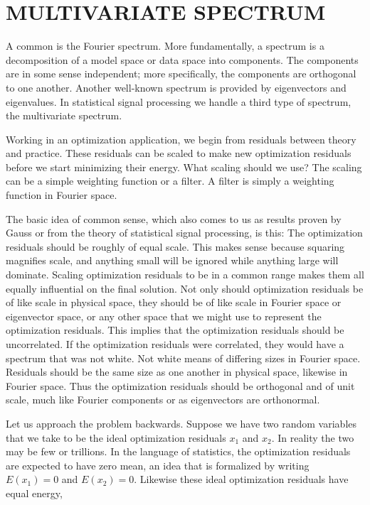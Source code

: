 \section{MULTIVARIATE SPECTRUM}
A common  is the Fourier spectrum.
More fundamentally,
a spectrum is a decomposition
of a model space or data space into components.
The components are in some sense independent; more specifically,
the components are orthogonal to one another.
Another well-known spectrum
is provided by eigenvectors and eigenvalues.
In statistical signal processing
we handle a third type of spectrum, the multivariate spectrum.
\par
Working in an optimization application,
we begin from residuals between theory and practice.
These residuals can be scaled to make new optimization residuals
before we start minimizing their energy.
What scaling should we use?
The scaling can be a simple weighting function or a filter.
A filter is simply a weighting function in Fourier space.
\par
The basic idea of common sense,
which also comes to us
as results proven by Gauss
or from the theory of statistical signal processing,
is this:
The optimization residuals should be roughly of equal scale.
This makes sense because squaring magnifies scale,
and anything small will be ignored while anything large will dominate.
Scaling optimization residuals to be in a common range makes
them all equally influential on the final solution.
Not only should optimization residuals be of like scale in physical space,
they should be of like scale in Fourier space
or eigenvector space,
or any other space that we might use to represent the optimization residuals.
This implies that the optimization residuals should be uncorrelated.
If the optimization residuals were correlated,
they would have a spectrum that was not white.
Not white means of differing sizes in Fourier space.
Residuals should be the same size as one another in physical space,
likewise in Fourier space.
Thus the optimization residuals should be orthogonal
and of unit scale, much like Fourier components
or as eigenvectors are orthonormal.
\par
Let us approach the problem backwards.
Suppose we have two random variables
that we take to be the ideal optimization residuals $x_1$ and $x_2$.
In reality the two may be few or trillions.
In the language of statistics,
the optimization residuals are expected to have zero mean,
an idea that is formalized by writing
$E(x_1)=0$
and 
$E(x_2)=0$.
Likewise these ideal optimization residuals have equal energy,

